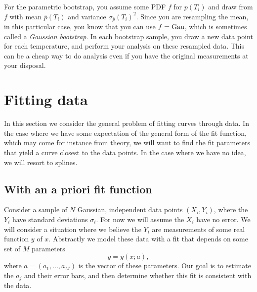 For the parametric bootstrap, you assume some PDF $f$ for $p(T_i)$
and draw from $f$ with mean $\bar p(T_i)$ and variance $\sigma_{\bar p}(T_i)^2$.
Since you are resampling the mean, in this particular case, you know that you
can use $f=\operatorname{Gau}$, which is sometimes called a {\it Gaussian
bootstrap}. In each bootstrap sample, you draw a new
data point for each temperature, and perform your analysis on these resampled
data. This can be a cheap way to do analysis even if you have the original
measurements at your disposal.


\section{Fitting data}

In this section we consider the general problem of fitting curves through data.
In the case where we have some expectation of the general form of the fit
function, which may come for instance from theory, we will want to find the fit
parameters that yield a curve closest to the data points. In the case where we
have no idea, we will resort to splines.

\subsection{With an a priori fit function}\label{sec:fitchi2}

Consider a sample of $N$ Gaussian, independent data points $(X_i,Y_i)$,
where the $Y_i$ have standard deviations $\sigma_i$. For now we will
assume the $X_i$ have no error. We will consider a situation where
we believe the $Y_i$ are measurements of some real function $y$ of $x$.
Abstractly we model these data with a fit that depends on some set
of $M$ parameters
\begin{equation}
  y=y(x;a),
\end{equation}
where $a=(a_1,...,a_M)$ is the vector of these parameters. Our goal
is to estimate the $a_j$ and their error bars, and then determine whether
this fit is consistent with the data.

